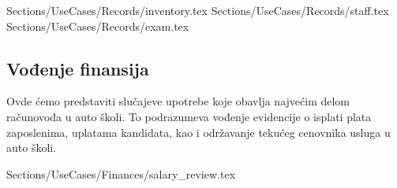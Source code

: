  {Sections/UseCases/Records/inventory.tex}
 {Sections/UseCases/Records/staff.tex}
 {Sections/UseCases/Records/exam.tex}


\subsection {Vođenje finansija}
Ovde ćemo predstaviti slučajeve upotrebe koje obavlja najvećim delom računovođa u auto školi.
To podrazumeva vođenje evidencije o isplati plata zaposlenima, uplatama kandidata, kao i održavanje tekućeg cenovnika usluga u auto školi.

 {Sections/UseCases/Finances/salary_review.tex}

